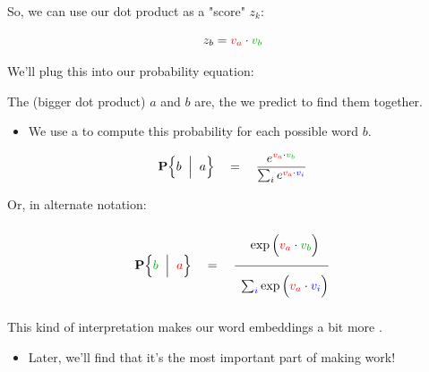         So, we can use our dot product as a "score" $z_k$:

        \begin{equation}
            z_b = \red{v_a} \cdot \grn{v_b}
        \end{equation}

        We'll plug this into our probability equation:\\

        \begin{kequation}
            The  (bigger dot product) $a$ and $b$ are, the  we predict to find them together.

            \begin{itemize}
                \item We use a  to compute this probability for each possible word $b$.
            \end{itemize}

            \begin{equation*}
                    \given{ b }{ a } 
                    \quad=\quad
                    \frac{e^{\red{v_a} \cdot \grn{v_b}} }{ \sum_i e^{\red{v_a} \cdot \blu{v_i} }}
            \end{equation*}

            Or, in alternate notation: 
            
            \begin{equation*}
                \given{ \grn{b} }{ \red{a} } 
                \quad=\quad
                \frac{  \phantom{ \Bigg|} 
                \exp \Big(\red{v_a} \cdot \grn{v_b}\Big) }
                {\phantom{ \Bigg|}
                \sum_{\blu{i}} \exp \Big(\red{v_a} \cdot \blu{v_i} \Big) }
            \end{equation*}
        \end{kequation}

        This kind of interpretation makes our word embeddings a bit more .

        \begin{itemize}
            \item Later, we'll find that it's the most important part of making  work!
        \end{itemize}




    

         





